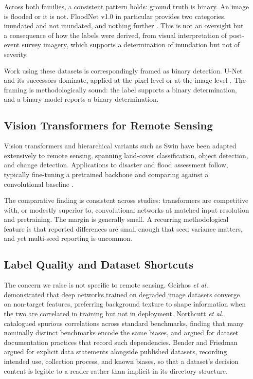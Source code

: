 Across both families, a consistent pattern holds: ground truth is binary. An
image is flooded or it is not. FloodNet v1.0 in particular provides two
categories, inundated and not inundated, and nothing further \cite{b9}. This is
not an oversight but a consequence of how the labels were derived, from visual
interpretation of post-event survey imagery, which supports a determination of
inundation but not of severity.

Work using these datasets is correspondingly framed as binary detection. U-Net
\cite{b11} and its successors dominate, applied at the pixel level or at the
image level \cite{b3,b4,b7,b11}. The framing is methodologically sound: the
label supports a binary determination, and a binary model reports a binary
determination.

\subsection{Vision Transformers for Remote Sensing}

Vision transformers \cite{b12} and hierarchical variants such as Swin
\cite{b13} have been adapted extensively to remote sensing, spanning land-cover
classification, object detection, and change detection. Applications to disaster
and flood assessment follow, typically fine-tuning a pretrained backbone and
comparing against a convolutional baseline \cite{b1,b2,b7,b8}.

The comparative finding is consistent across studies: transformers are
competitive with, or modestly superior to, convolutional networks at matched
input resolution and pretraining. The margin is generally small. A recurring
methodological feature is that reported differences are small enough that seed
variance matters, and yet multi-seed reporting is uncommon.

\subsection{Label Quality and Dataset Shortcuts}

The concern we raise is not specific to remote sensing. Geirhos \emph{et al.}
\cite{b14} demonstrated that deep networks trained on degraded image datasets
converge on non-target features, preferring background texture to shape
information when the two are correlated in training but not in deployment.
Northcutt \emph{et al.} \cite{b15} catalogued spurious correlations across
standard benchmarks, finding that many nominally distinct benchmarks encode the
same biases, and argued for dataset documentation practices that record such
dependencies. Bender and Friedman \cite{b16} argued for explicit data statements
alongside published datasets, recording intended use, collection process, and
known biases, so that a dataset's decision content is legible to a reader rather
than implicit in its directory structure.


